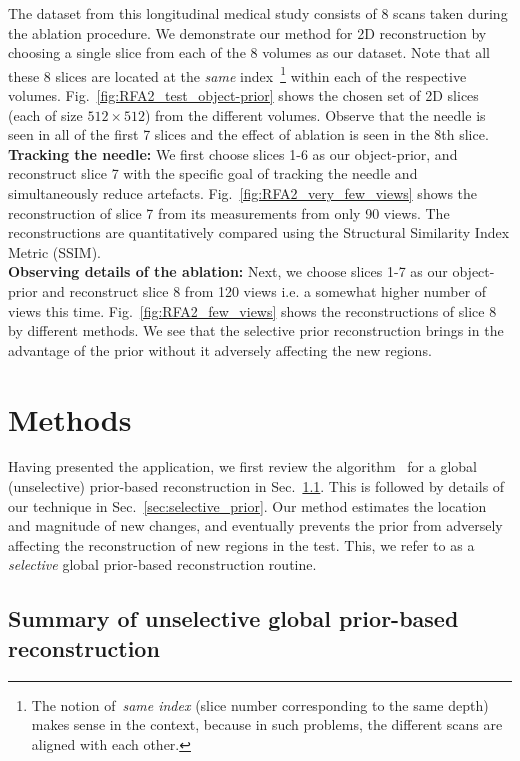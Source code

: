 \documentclass[journal]{IEEEtran}
\begin{document}
The dataset from this longitudinal medical study consists of 8 scans taken during the ablation procedure. We demonstrate our method for 2D reconstruction by choosing a single slice from each of the 8 volumes as our dataset. Note that all these 8 slices are located at the \emph{same} index~\footnote{The notion of~\textit{same index} (slice number corresponding to the same depth) makes sense in the context, because in such problems, the different scans are aligned with each other.} within each of the respective volumes. Fig.~\ref{fig:RFA2_test_object-prior} shows the chosen set of 2D slices (each of size $512 \times 512$) from the different volumes. Observe that the needle is seen in all of the first 7 slices  and the effect of ablation is seen in the 8th slice. \\

\textbf{Tracking the needle:} We first choose slices 1-6 as our object-prior, and reconstruct slice 7 with the specific goal of tracking the needle and simultaneously reduce artefacts. Fig.~\ref{fig:RFA2_very_few_views} shows the reconstruction of slice 7 from its measurements from only 90 views. The reconstructions are quantitatively compared using the Structural Similarity Index Metric (SSIM).\\ 

\textbf{Observing details of the ablation:} Next, we choose slices 1-7 as our object-prior and reconstruct slice 8 from 120 views i.e. a somewhat higher number of views this time. Fig.~\ref{fig:RFA2_few_views} shows the reconstructions of slice 8 by different methods. We see that the selective prior reconstruction brings in the advantage of the prior without it adversely affecting the new regions.

\section{Methods}
\label{sec:methods}
Having presented the application, we first review the algorithm~\cite{my_dicta_paper} for a global (unselective) prior-based reconstruction in Sec.~\ref{sec:unselective_global_prior}. This is followed by details of our technique in Sec.~\ref{sec:selective_prior}. Our method estimates the location and magnitude of new changes, and eventually prevents the prior from adversely affecting the reconstruction of new regions in the test. This, we refer to as a \textit{selective} global prior-based reconstruction routine.
\subsection{\textbf{Summary of unselective global prior-based reconstruction}}
\label{sec:unselective_global_prior}
\end{document}
